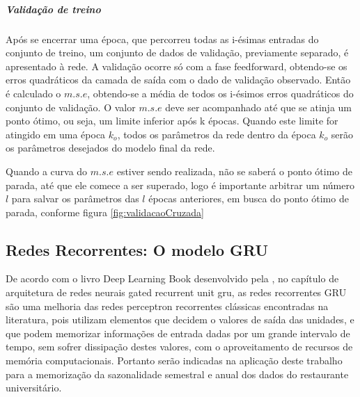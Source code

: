             \subparagraph{Validação de treino}
                Após se encerrar uma época, que percorreu todas as i-ésimas entradas do conjunto de treino, um conjunto de dados de validação, previamente separado, é apresentado à rede.
                A validação ocorre só com a fase feedforward, obtendo-se os erros quadráticos da camada de saída com o dado de validação observado.
                Então é calculado o $m.s.e$, obtendo-se a média de todos os i-ésimos erros quadráticos do conjunto de validação.
                O valor $m.s.e$ deve ser acompanhado até que se atinja um ponto ótimo, ou seja, um limite inferior após k épocas.
                Quando este limite for atingido em uma época $k_o$, todos os parâmetros da rede dentro da época $k_o$ serão os parâmetros desejados do modelo final da rede.
                
                Quando a curva do $m.s.e$ estiver sendo realizada, não se saberá o ponto ótimo de parada, até que ele comece a ser superado, logo é importante arbitrar um número $l$ para salvar os parâmetros das $l$ épocas anteriores, em busca do ponto ótimo de parada, conforme figura \ref{fig:validacaoCruzada}
                
      
        
        \subsection{Redes Recorrentes: O modelo GRU}
         	De acordo com  o livro Deep Learning Book desenvolvido pela  \cite{DLB}, no capítulo de arquitetura de redes neurais gated recurrent unit gru, as redes recorrentes GRU são uma melhoria das redes perceptron recorrentes clássicas encontradas na literatura, pois utilizam elementos que decidem o valores de saída das unidades, e que podem memorizar informações de entrada dadas por um grande intervalo de tempo, sem sofrer dissipação destes valores, com o aproveitamento de recursos de memória computacionais. Portanto serão indicadas na aplicação deste trabalho para a memorização da sazonalidade semestral e anual dos dados do restaurante universitário.
            \begin{figure}[H]
            \end{figure}